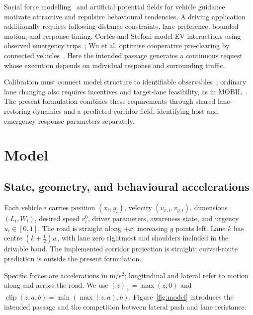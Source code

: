 \documentclass[conference,a4paper]{IEEEtran}
\newcommand{\clip}{\operatorname{clip}}
\begin{document}
Social force modelling~\cite{helbing95} and artificial potential fields for vehicle guidance~\cite{gerdes01,wolf08} motivate attractive and repulsive behavioural tendencies. A driving application additionally requires following-distance constraints, lane preference, bounded motion, and response timing. Cort\'es and Stefoni model EV interactions using observed emergency trips~\cite{cortes23}; Wu et al. optimise cooperative pre-clearing by connected vehicles~\cite{wu20}. Here the intended passage generates a continuous request whose execution depends on individual response and surrounding traffic.

Calibration must connect model structure to identifiable observables~\cite{punzo21,thiemann08}; ordinary lane changing also requires incentives and target-lane feasibility, as in MOBIL~\cite{kesting07}. The present formulation combines these requirements through shared lane-restoring dynamics and a predicted-corridor field, identifying host and emergency-response parameters separately.

\section{Model}
\label{sec:model}
\subsection{State, geometry, and behavioural accelerations}
Each vehicle $i$ carries position $(x_i,y_i)$, velocity $(v_{x,i},v_{y,i})$, dimensions $(L_i,W_i)$, desired speed $v_i^0$, driver parameters, awareness state, and urgency $u_i\in[0,1]$. The road is straight along $+x$; increasing $y$ points left. Lane $k$ has centre $(k+\tfrac12)w$, with lane zero rightmost and shoulders included in the drivable band. The implemented corridor projection is straight; curved-route prediction is outside the present formulation.

Specific forces are accelerations in m/s$^2$; longitudinal and lateral refer to motion along and across the road. We use $(z)_+=\max(z,0)$ and $\clip(z,a,b)=\min(\max(z,a),b)$. Figure~\ref{fig:model} introduces the intended passage and the competition between lateral push and lane resistance.
\end{document}
